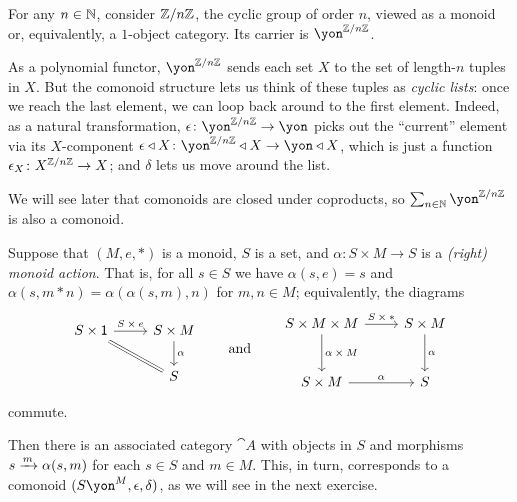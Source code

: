 \documentclass[Book-Poly]{subfiles}
\begin{document}
\begin{example}
For any $n\in\mathbb{N}$, consider $\mathbb{Z}/n\mathbb{Z}$, the cyclic group of order $n$, viewed as a monoid or, equivalently, a $1$-object category.
Its carrier is $\yon^{\zz/n\zz}$.

As a polynomial functor, $\yon^{\zz/n\zz}$ sends each set $X$ to the set of length-$n$ tuples in $X$.
But the comonoid structure lets us think of these tuples as \emph{cyclic lists}: once we reach the last element, we can loop back around to the first element.
Indeed, as a natural transformation, $\epsilon\colon\yon^{\zz/n\zz}\to\yon$ picks out the ``current'' element via its $X$-component $\epsilon\tri X\colon\yon^{\zz/n\zz}\tri X\to\yon\tri X$, which is just a function $\epsilon_X\colon X^{\mathbb{Z}/n\mathbb{Z}}\to X$; and $\delta$ lets us move around the list.%

We will see later that comonoids are closed under coproducts, so $\sum_{n\in\nn}\yon^{\zz/n\zz}$ is also a comonoid.
\end{example}

\begin{example}\label{ex.monoid_action}
Suppose that $(M,e,*)$ is a monoid, $S$ is a set, and $\alpha\colon S\times M\to S$ is a \emph{(right) monoid action}.
That is, for all $s\in S$ we have $\alpha(s,e)=s$ and $\alpha(s,m*n)=\alpha(\alpha(s,m),n)$ for $m,n\in M$; equivalently, the diagrams
\[
\begin{tikzcd}
	S\times\1\ar[rd,equals]\ar[r,"S\:\times\:e"] & S\times M\ar[d,"\alpha"]\\
	& S
\end{tikzcd}
\qqand
\begin{tikzcd}[row sep=large]
    S\times M\times M\ar[r,"S\:\times\:*"]\ar[d,"\alpha\:\times\:M"] & S\times M\ar[d,"\alpha"]\\
    S\times M\ar[r,"\alpha"] & S
\end{tikzcd}
\]
commute.

Then there is an associated category $\cat{A}$ with objects in $S$ and morphisms $s\xrightarrow{m}\alpha(s,m)$ for each $s\in S$ and $m\in M$.
This, in turn, corresponds to a comonoid $(S\yon^M,\epsilon,\delta)$, as we will see in the next exercise.
\end{example}
\end{document}
